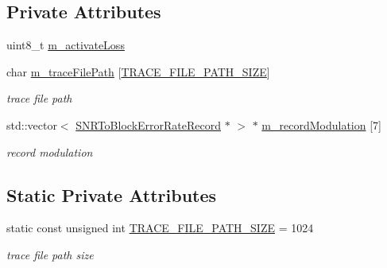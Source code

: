 \subsection*{Private Attributes}
\begin{DoxyCompactItemize}
\item 
uint8\+\_\+t \hyperlink{classns3_1_1SNRToBlockErrorRateManager_ac12a64ac423a9051a6f2cebf82fb3259}{m\+\_\+activate\+Loss}
\item 
char \hyperlink{classns3_1_1SNRToBlockErrorRateManager_afad17b18f37193d9fe86a8ba617a2f9d}{m\+\_\+trace\+File\+Path} \mbox{[}\hyperlink{classns3_1_1SNRToBlockErrorRateManager_a41b59c050f6d25b317a8dc2ac530146c}{T\+R\+A\+C\+E\+\_\+\+F\+I\+L\+E\+\_\+\+P\+A\+T\+H\+\_\+\+S\+I\+ZE}\mbox{]}
\begin{DoxyCompactList}\small\item\em trace file path \end{DoxyCompactList}\item 
std\+::vector$<$ \hyperlink{classns3_1_1SNRToBlockErrorRateRecord}{S\+N\+R\+To\+Block\+Error\+Rate\+Record} $\ast$ $>$ $\ast$ \hyperlink{classns3_1_1SNRToBlockErrorRateManager_af74c812f3b0a25252f2897aadea6898e}{m\+\_\+record\+Modulation} \mbox{[}7\mbox{]}
\begin{DoxyCompactList}\small\item\em record modulation \end{DoxyCompactList}\end{DoxyCompactItemize}
\subsection*{Static Private Attributes}
\begin{DoxyCompactItemize}
\item 
static const unsigned int \hyperlink{classns3_1_1SNRToBlockErrorRateManager_a41b59c050f6d25b317a8dc2ac530146c}{T\+R\+A\+C\+E\+\_\+\+F\+I\+L\+E\+\_\+\+P\+A\+T\+H\+\_\+\+S\+I\+ZE} = 1024
\begin{DoxyCompactList}\small\item\em trace file path size \end{DoxyCompactList}\end{DoxyCompactItemize}
